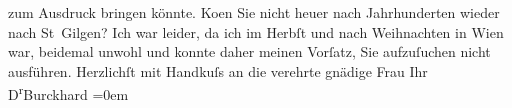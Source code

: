 \begin{ledgroupsized}[t]{13cm}
               zum Ausdruck bringen könnte.\pend
           \pstart
           Ko{\geminationm}en Sie nicht heuer nach Jahrhunderten wieder nach St Gilgen? Ich war leider, da ich im Herbſt und
               nach Weihnachten in Wien war, beidemal unwohl und
               konnte daher meinen Vorſatz, Sie aufzuſuchen nicht ausführen.\pend
           \pstart
           Herzlichſt mit Handkuſs an die verehrte gnädige Frau\pend
           \pstart
           Ihr{\\[\baselineskip]}\spacefill\mbox{D\textsuperscript{r}Burckhard}\pend
           \leftskip=0em{}
         
         \endnumbering{}\end{ledgroupsized}  \newcommand{\dateiname}{L01774}\newcommand{\titel}{Max Burckhard an Arthur Schnitzler, 7. 6. 1908}\newcommand{\editorInnen}{Martin Anton Müller und Gerd-Hermann Susen}
      